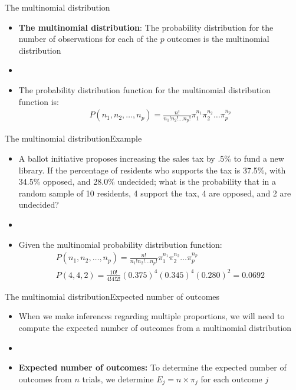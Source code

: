 \documentclass[xcolor=dvipsnames]{beamer}
\begin{document}
\begin{frame}{The multinomial distribution}
	\begin{itemize}
		\item \textbf{The multinomial distribution}: The probability distribution for the number of observations for each of the $p$ outcomes is the multinomial distribution
		\item[]
		\item The probability distribution function for the multinomial distribution function is:
		\begin{gather*}
			P(n_1, n_2, \hdots, n_p) = \frac{n!}{n_1!n_2!\hdots n_p!}\pi_1^{n_1}\pi_2^{n_2}\hdots \pi_p^{n_p}
		\end{gather*}
	\end{itemize}
\end{frame}

\begin{frame}{The multinomial distribution}{Example}
	\begin{itemize}
		\item A ballot initiative proposes increasing the sales tax by .5\% to fund a new library. If the percentage of residents who supports the tax is 37.5\%, with 34.5\% opposed, and 28.0\% undecided; what is the probability that in a random sample of 10 residents, 4 support the tax, 4 are opposed, and 2 are undecided?
		\item[]
		\item Given the multinomial probability distribution function:
		\begin{gather*}
			P(n_1, n_2, \hdots, n_p) = \frac{n!}{n_1!n_2!\hdots n_p!}\pi_1^{n_1}\pi_2^{n_2}\hdots \pi_p^{n_p} \\
			P(4, 4, 2) = \frac{10!}{4!4!2!}(0.375)^{4}(0.345)^{4}(0.280)^{2} = 0.0692
		\end{gather*}
	\end{itemize}
\end{frame}

\begin{frame}{The multinomial distribution}{Expected number of outcomes}
	\begin{itemize}
		\item When we make inferences regarding multiple proportions, we will need to compute the expected number of outcomes from a multinomial distribution
		\item[]
		\item \textbf{Expected number of outcomes:} To determine the expected number of outcomes from $n$ trials, we determine $E_j = n\times \pi_j$ for each outcome $j$
	\end{itemize}
\end{frame}
\end{document}

